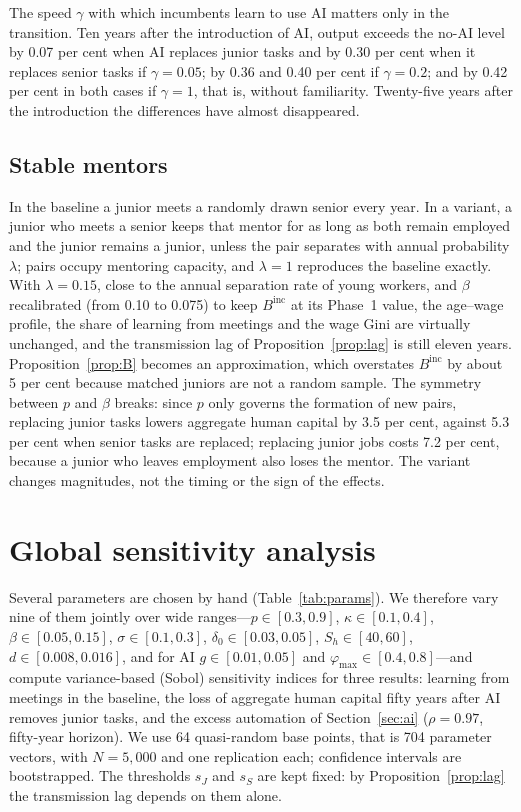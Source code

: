 \documentclass[preprint,12pt,authoryear]{elsarticle}
\begin{document}
The speed $\gamma$ with which incumbents learn to use AI matters only in the transition. Ten years after the introduction of AI, output exceeds the no-AI level by 0.07 per cent when AI replaces junior tasks and by 0.30 per cent when it replaces senior tasks if $\gamma=0.05$; by 0.36 and 0.40 per cent if $\gamma=0.2$; and by 0.42 per cent in both cases if $\gamma=1$, that is, without familiarity. Twenty-five years after the introduction the differences have almost disappeared.

\subsection{Stable mentors}

In the baseline a junior meets a randomly drawn senior every year. In a variant, a junior who meets a senior keeps that mentor for as long as both remain employed and the junior remains a junior, unless the pair separates with annual probability $\lambda$; pairs occupy mentoring capacity, and $\lambda=1$ reproduces the baseline exactly. With $\lambda=0.15$, close to the annual separation rate of young workers, and $\beta$ recalibrated (from 0.10 to 0.075) to keep $B^{\mathrm{inc}}$ at its Phase~1 value, the age--wage profile, the share of learning from meetings and the wage Gini are virtually unchanged, and the transmission lag of Proposition~\ref{prop:lag} is still eleven years. Proposition~\ref{prop:B} becomes an approximation, which overstates $B^{\mathrm{inc}}$ by about 5 per cent because matched juniors are not a random sample. The symmetry between $p$ and $\beta$ breaks: since $p$ only governs the formation of new pairs, replacing junior tasks lowers aggregate human capital by 3.5 per cent, against 5.3 per cent when senior tasks are replaced; replacing junior jobs costs 7.2 per cent, because a junior who leaves employment also loses the mentor. The variant changes magnitudes, not the timing or the sign of the effects.

\section{Global sensitivity analysis}\label{app:sobol}

Several parameters are chosen by hand (Table~\ref{tab:params}). We therefore vary nine of them jointly over wide ranges---$p\in[0.3,0.9]$, $\kappa\in[0.1,0.4]$, $\beta\in[0.05,0.15]$, $\sigma\in[0.1,0.3]$, $\delta_0\in[0.03,0.05]$, $S_h\in[40,60]$, $d\in[0.008,0.016]$, and for AI $g\in[0.01,0.05]$ and $\varphi_{\max}\in[0.4,0.8]$---and compute variance-based (Sobol) sensitivity indices \citep{Sobol2001,Saltelli2008} for three results: learning from meetings in the baseline, the loss of aggregate human capital fifty years after AI removes junior tasks, and the excess automation of Section~\ref{sec:ai} ($\rho=0.97$, fifty-year horizon). We use 64 quasi-random base points, that is 704 parameter vectors, with $N=5{,}000$ and one replication each; confidence intervals are bootstrapped. The thresholds $s_J$ and $s_S$ are kept fixed: by Proposition~\ref{prop:lag} the transmission lag depends on them alone.
\end{document}
